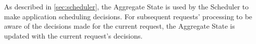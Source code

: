 As described in \cref{sec:scheduler}, the Aggregate State is used by the Scheduler to make application scheduling decisions. For subsequent requests' processing to be aware of the decisions made for the current request, the Aggregate State is updated with the current request's decisions. 

